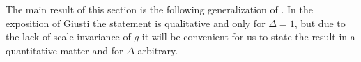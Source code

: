 \documentclass[reqno,12pt,letterpaper]{amsart}
\newcommand*\dif{\mathop{}\!\mathrm{d}}
\newtheorem{sublemma}[theorem]{Sublemma}
\theoremstyle{definition}
\numberwithin{equation}{section}
\begin{document}


The main result of this section is the following generalization of \cite[Lemma 7.5]{Giusti77}.
In the exposition of Giusti the statement is qualitative and only for $\Delta = 1$, but due to the lack of scale-invariance of $g$ it will be convenient for us to state the result in a quantitative matter and for $\Delta$ arbitrary.
\end{document}
